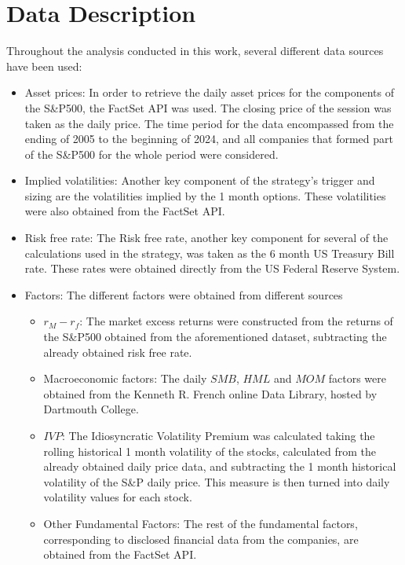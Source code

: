 \section{Data Description}
\label{sec:data-description}
Throughout the analysis conducted in this work, several different data sources have been used:
\begin{itemize}
    \item Asset prices: In order to retrieve the daily asset prices for the components of the S\&P500, the FactSet API was used. The closing price of the session was taken as the daily price. The time period for the data encompassed from the ending of 2005 to the beginning of 2024, and all companies that formed part of the S\&P500 for the whole period were considered. 
    \item Implied volatilities: Another key component of the strategy's trigger and sizing are the volatilities implied by the 1 month options. These volatilities were also obtained from the FactSet API. 
    \item Risk free rate: The Risk free rate, another key component for several of the calculations used in the strategy, was taken as the 6 month US Treasury Bill rate. These rates were obtained directly from the US Federal Reserve System.
    \item Factors: The different factors were obtained from different sources
    \begin{itemize}
        \item $r_M-r_f$: The market excess returns were constructed from the returns of the S\&P500 obtained from the aforementioned dataset, subtracting the already obtained risk free rate.
        \item Macroeconomic factors: The daily $SMB$, $HML$ and $MOM$ factors were obtained from the Kenneth R. French online Data Library, hosted by Dartmouth College.
        \item $IVP$: The Idiosyncratic Volatility Premium was calculated taking the rolling historical 1 month volatility of the stocks, calculated from the already obtained daily price data, and subtracting the 1 month historical volatility of the S\&P daily price. This measure is then turned into daily volatility values for each stock. 
        \item Other Fundamental Factors: The rest of the fundamental factors, corresponding to disclosed financial data from the companies, are obtained from the FactSet API. 
    \end{itemize}
\end{itemize}
